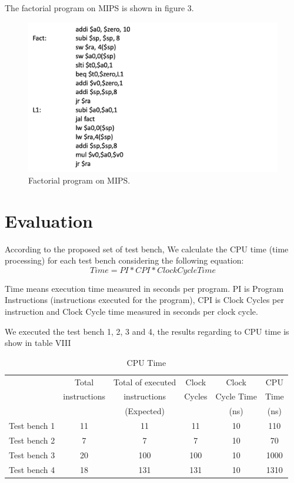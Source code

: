 \documentclass[conference]{IEEEtran}
\begin{document}
The factorial program on MIPS is shown in figure 3.
\begin{figure}[h]
\begin{center}
\includegraphics[scale=0.45]{MIPS_Factorial.png}
\caption{Factorial program on MIPS.}
\label{fact_mips}
\end{center}
\end{figure}
 
\section{Evaluation}

According to the proposed set of test bench, We calculate the CPU time \cite{b3} (time processing) for each test bench considering the following equation:
\[Time = PI * CPI * Clock Cycle Time\] 

Time means execution time measured in seconds per program. PI is Program Instructions (instructions executed for the program), CPI is Clock Cycles per instruction and Clock Cycle time measured in seconds per clock cycle.

We executed the test bench 1, 2, 3 and 4, the results regarding to CPU time is show in table VIII

\begin{table}[h]
	\caption{CPU Time} %
	\begin{center}
		\begin{tabular}{|c|c|c|c|c|c|}
			\hline
			&Total&Total of executed&Clock&Clock&CPU\\
			&instructions&instructions&Cycles&Cycle Time&Time\\
			&&(Expected)&&(ns)&(ns)\\
			\hline
			Test bench 1&11&11&11&10&110\\
			\hline
			Test bench 2&7&7&7&10&70\\
			\hline
			Test bench 3&20&100&100&10&1000\\
			\hline
			Test bench 4&18&131&131&10&1310\\
			\hline
		\end{tabular}
		\label{tab_test3}
	\end{center}
\end{table}
\end{document}
